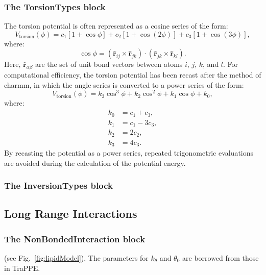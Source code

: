 \documentclass[]{book}
\begin{document}
\subsubsection{\label{section:ffTorsion}The TorsionTypes block}
The torsion potential is often represented as a cosine series of the
form:
\begin{equation}
V_{\text{torsion}}(\phi) = c_1[1 + \cos \phi] 
	+ c_2[1 + \cos(2\phi)] 
 	+ c_3[1 + \cos(3\phi)],
\label{eq:origTorsionPot}
\end{equation}
where:
\begin{equation}
\cos\phi = (\hat{\mathbf{r}}_{ij} \times \hat{\mathbf{r}}_{jk}) \cdot
	(\hat{\mathbf{r}}_{jk} \times \hat{\mathbf{r}}_{kl}).
\label{eq:torsPhi}
\end{equation}
Here, $\hat{\mathbf{r}}_{\alpha\beta}$ are the set of unit bond
vectors between atoms $i$, $j$, $k$, and $l$. For computational
efficiency, the torsion potential has been recast after the method of
{\sc charmm},\cite{Brooks83} in which the angle series is converted to
a power series of the form:
\begin{equation}
V_{\text{torsion}}(\phi) =  
	k_3 \cos^3 \phi + k_2 \cos^2 \phi + k_1 \cos \phi + k_0,
\label{eq:torsionPot}
\end{equation}
where:
\begin{align*}
k_0 &= c_1 + c_3, \\
k_1 &= c_1 - 3c_3, \\
k_2 &= 2 c_2, \\
k_3 &= 4c_3.
\end{align*}
By recasting the potential as a power series, repeated trigonometric
evaluations are avoided during the calculation of the potential
energy.

\subsubsection{\label{section:ffInversion}The InversionTypes block}
\subsection{\label{section::ffLongRange}Long Range Interactions}
\subsubsection{\label{section:ffNBinteraction}The NonBondedInteraction block}



(see Fig.~\ref{fig:lipidModel}), The parameters for $k_{\theta}$ and
$\theta_0$ are borrowed from those in TraPPE.\cite{Siepmann1998}
\end{document}

